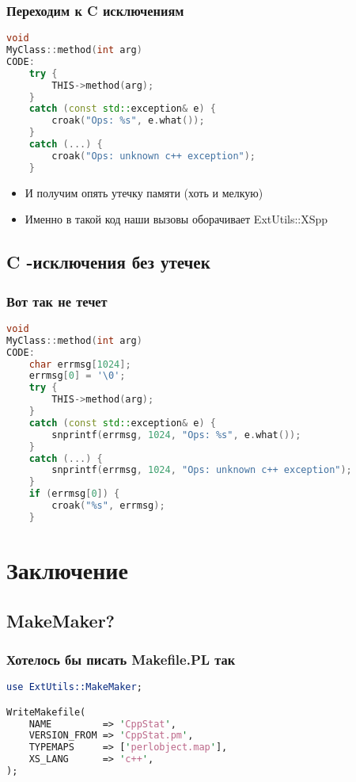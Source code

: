 \documentclass[pdflatex,hyperref={unicode=true}]{beamer}
\DeclareRobustCommand{\cpp}{
    \texorpdfstring{\hbox{C\hspace{-0.5ex}\protect\raisebox{0.5ex}{\protect\scalebox{0.67}{++}}}}{C++}
}
\begin{document}
\begin{frame}[t,fragile]
    \frametitle{Переходим к \cpp исключениям}
    \begin{lstlisting}[language=C++,style=PerlXS]
void
MyClass::method(int arg)
CODE:
    try {
        THIS->method(arg);
    }
    catch (const std::exception& e) {
        croak("Ops: %s", e.what());
    }
    catch (...) {
        croak("Ops: unknown c++ exception");
    }
    \end{lstlisting}
    \begin{itemize}
        \item<2-| alert@2-> И получим опять утечку памяти (хоть и мелкую)
        \item<3-> Именно в такой код наши вызовы оборачивает ExtUtils::XSpp
    \end{itemize}
\end{frame}

\subsection{\cpp-исключения без утечек}
\begin{frame}[t,fragile]
    \frametitle{Вот так не течет}
    \begin{lstlisting}[language=C++,style=PerlXS]
void
MyClass::method(int arg)
CODE:
    char errmsg[1024];
    errmsg[0] = '\0';
    try {
        THIS->method(arg);
    }
    catch (const std::exception& e) {
        snprintf(errmsg, 1024, "Ops: %s", e.what());
    }
    catch (...) {
        snprintf(errmsg, 1024, "Ops: unknown c++ exception");
    }
    if (errmsg[0]) {
        croak("%s", errmsg);
    }
    \end{lstlisting}
\end{frame}

\section{Заключение}

\subsection{MakeMaker?}

\begin{frame}[t,fragile]
    \frametitle{Хотелось бы писать Makefile.PL так}
    \begin{lstlisting}[language=Perl]
use ExtUtils::MakeMaker;

WriteMakefile(
    NAME         => 'CppStat',
    VERSION_FROM => 'CppStat.pm',
    TYPEMAPS     => ['perlobject.map'],
    XS_LANG      => 'c++',
);
    \end{lstlisting}
\end{frame}
\end{document}
